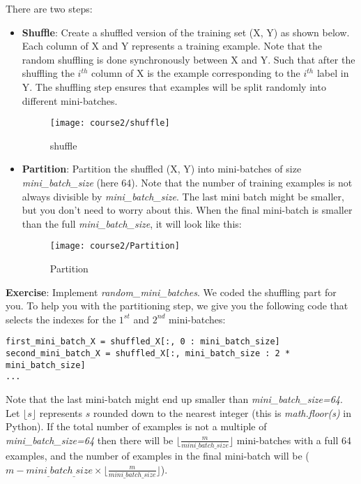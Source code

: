 {There are two steps:
\begin{itemize}
\item {\textbf {Shuffle}}: Create a shuffled version of the training set (X, Y) as shown below. Each column of X and Y represents a training example. Note that the random shuffling is done synchronously between X and Y. Such that after the shuffling the $i^{th}$ column of X is the example corresponding to the $i^{th}$ label in Y. The shuffling step ensures that examples will be split randomly into different mini-batches. 
\begin{figure}[h]
\begin{center}
\texttt{[image: course2/shuffle]}
\end{center}
\caption{shuffle}
\end{figure}

\item {\textbf {Partition}}: Partition the shuffled (X, Y) into mini-batches of size \emph{mini\_batch\_size} (here 64). Note that the number of training examples is not always divisible by \emph{mini\_batch\_size}. The last mini batch might be smaller, but you don't need to worry about this. When the final mini-batch is smaller than the full \emph{mini\_batch\_size}, it will look like this: 
\begin{figure}[h]
\begin{center}
\texttt{[image: course2/Partition]}
\end{center}
\caption{Partition}
\end{figure}

\end{itemize}

{\textbf {Exercise}}: Implement \emph{random\_mini\_batches}. We coded the shuffling part for you. To help you with the partitioning step, we give you the following code that selects the indexes for the $1^{st}$ and $2^{nd}$ mini-batches:
\begin{verbatim}
first_mini_batch_X = shuffled_X[:, 0 : mini_batch_size]
second_mini_batch_X = shuffled_X[:, mini_batch_size : 2 * mini_batch_size]
...
\end{verbatim}

Note that the last mini-batch might end up smaller than \emph{mini\_batch\_size=64}. Let $\lfloor s \rfloor$ represents $s$ rounded down to the nearest integer (this is \emph{math.floor(s)} in Python). If the total number of examples is not a multiple of \emph{mini\_batch\_size=64} then there will be $\lfloor \frac{m}{mini\_batch\_size}\rfloor$ mini-batches with a full 64 examples, and the number of examples in the final mini-batch will be ($m-mini_\_batch_\_size \times \lfloor \frac{m}{mini\_batch\_size}\rfloor$). 

}
